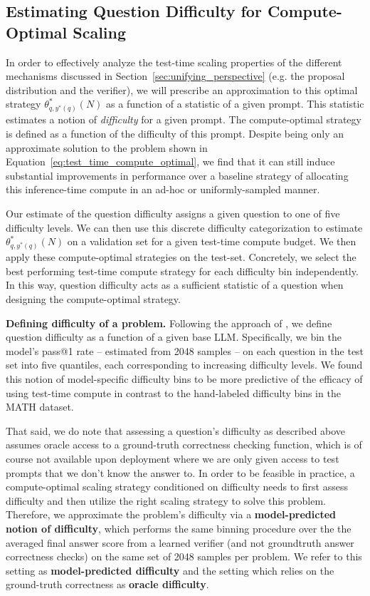 \subsection{Estimating Question Difficulty for Compute-Optimal Scaling} 
\vspace{-0.2cm}
In order to effectively analyze the test-time scaling properties of the different mechanisms discussed in Section~\ref{sec:unifying_perspective} (e.g. the proposal distribution and the verifier), we will prescribe an approximation to this optimal strategy $\theta^{*}_{q,y^*(q)}(N)$ as a function of a statistic of a given prompt. This statistic estimates a notion of \emph{difficulty} for a given prompt. The compute-optimal strategy is defined as a function of the difficulty of this prompt. Despite being only an approximate solution to the problem shown in Equation~\ref{eq:test_time_compute_optimal}, we find that it can still induce substantial improvements in performance over a baseline strategy of allocating this inference-time compute in an ad-hoc or uniformly-sampled manner.

Our estimate of the question difficulty assigns a given question to one of five difficulty levels. We can then use this discrete difficulty categorization to estimate $\theta^{*}_{q,y^*(q)}(N)$ on a validation set for a given test-time compute budget. We then apply these compute-optimal strategies on the test-set. Concretely, we select the best performing test-time compute strategy for each difficulty bin independently. In this way, question difficulty acts as a sufficient statistic of a question when designing the compute-optimal strategy.

\textbf{Defining difficulty of a problem.} Following the approach of \citet{lightman2023lets}, we define question difficulty as a function of a given base LLM. Specifically, we bin the model's pass@1 rate -- estimated from 2048 samples -- on each question in the test set into five quantiles, each corresponding to increasing difficulty levels. We found this notion of model-specific difficulty bins to be more predictive of the efficacy of using test-time compute in contrast to the hand-labeled difficulty bins in the MATH dataset.

That said, we do note that assessing a question's difficulty as described above assumes oracle access to a ground-truth correctness checking function, which is of course not available upon deployment where we are only given access to test prompts that we don't know the answer to. In order to be feasible in practice, a compute-optimal scaling strategy conditioned on difficulty needs to first assess difficulty and then utilize the right scaling strategy to solve this problem.
Therefore, we approximate the problem's difficulty via a \textbf{model-predicted notion of difficulty}, which performs the same binning procedure over the the averaged final answer score from a learned verifier (and not groundtruth answer correctness checks) on the same set of 2048 samples per problem. We refer to this setting as \textbf{model-predicted difficulty} and the setting which relies on the ground-truth correctness as \textbf{oracle difficulty}.

